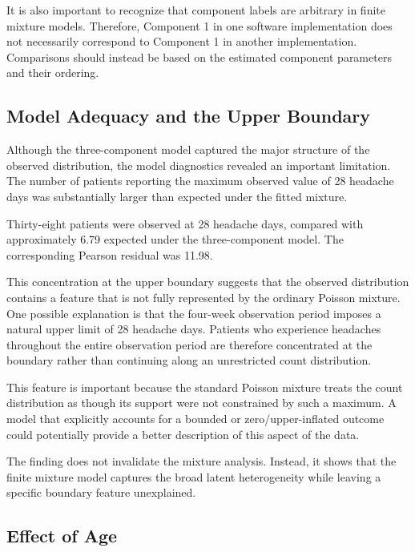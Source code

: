 It is also important to recognize that component labels are arbitrary
in finite mixture models. Therefore, Component 1 in one software
implementation does not necessarily correspond to Component 1 in
another implementation. Comparisons should instead be based on the
estimated component parameters and their ordering.

\subsection{Model Adequacy and the Upper Boundary}

Although the three-component model captured the major structure of
the observed distribution, the model diagnostics revealed an
important limitation. The number of patients reporting the maximum
observed value of 28 headache days was substantially larger than
expected under the fitted mixture.

Thirty-eight patients were observed at 28 headache days, compared
with approximately 6.79 expected under the three-component model.
The corresponding Pearson residual was 11.98.

This concentration at the upper boundary suggests that the observed
distribution contains a feature that is not fully represented by the
ordinary Poisson mixture. One possible explanation is that the
four-week observation period imposes a natural upper limit of
28 headache days. Patients who experience headaches throughout the
entire observation period are therefore concentrated at the boundary
rather than continuing along an unrestricted count distribution.

This feature is important because the standard Poisson mixture treats
the count distribution as though its support were not constrained by
such a maximum. A model that explicitly accounts for a bounded or
zero/upper-inflated outcome could potentially provide a better
description of this aspect of the data.

The finding does not invalidate the mixture analysis. Instead, it
shows that the finite mixture model captures the broad latent
heterogeneity while leaving a specific boundary feature unexplained.

\subsection{Effect of Age}

